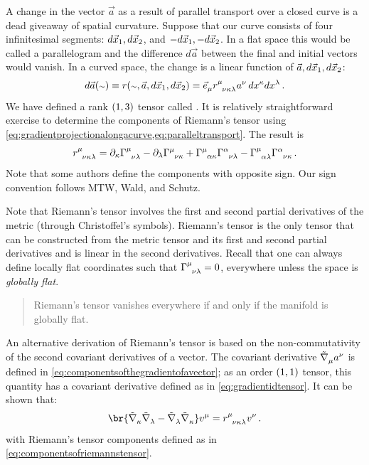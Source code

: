  A change in the vector $\vec a$ as a result of parallel transport over a closed curve is a dead giveaway of spatial curvature. Suppose that our curve consists of four infinitesimal segments: $d\vec{x}_1, d\vec{x}_2$, and $-d\vec{x}_1,-d\vec{x}_2$. In a flat space this would be called a parallelogram and the difference $d\vec a$ between the final and initial vectors would vanish. In a curved space, the change is a linear function of $\vec a,d\vec{x}_1,d\vec{x}_2$:
%
\begin{equation}\label{eq:definitionofriemannstensor}
  d\vec a\vat{\cslot} \defas \riemann\vat{\cslot,\vec a,d\vec\pos_1,d\vec\pos_2}
                      = \tbvec\mu\triemann\mu\nu\kappa\lambda\tvec a\nu\,d\tvec\pos\kappa d\tvec\pos\lambda\,.
\end{equation}
%
We have defined a rank $\torder 13$ tensor called . It is relatively straightforward exercise to determine the components of Riemann's tensor using \cref{eq:gradientprojectionalongacurve,eq:paralleltransport}. The result is
%
\begin{equation}\label{eq:componentsofriemannstensor}
  \triemann\mu\nu\kappa\lambda = \ipd\kappa\tchris\mu\nu\lambda 
                               - \ipd\lambda\tchris\mu\nu\kappa
                               + \tchris\mu\alpha\kappa \tchris\alpha\nu\lambda
                               - \tchris\mu\alpha\lambda \tchris\alpha\nu\kappa \,.
\end{equation}
%
Note that some authors define the components with opposite sign. Our sign convention follows MTW, Wald, and Schutz.

 Note that Riemann's tensor involves the first and second partial derivatives of the metric (through Christoffel's symbols). Riemann's tensor is the only tensor that can be constructed from the metric tensor and its first and second partial derivatives and is linear in the second derivatives. Recall that one can always define locally flat coordinates such that $\tchris\mu\nu\lambda = 0$, everywhere unless the space is \emph{globally flat}.
%
\begin{quotation}
  Riemann's tensor vanishes everywhere if and only if the manifold is globally flat.
\end{quotation}

 An alternative derivation of Riemann's tensor is based on the non-commutativity of the second covariant derivatives of a vector. The covariant derivative $\tgradcov\mu\tvec a\nu$ is defined in \cref{eq:componentsofthegradientofavector}; as an order $\torder 11$ tensor, this quantity has a covariant derivative defined as in \cref{eq:gradientidtensor}. It can be shown that:
%
\begin{equation}\label{eq:riemanntensorequality}
  \br{\tgradcov\kappa\tgradcov\lambda - \tgradcov\lambda\tgradcov\kappa}\tvec v\mu 
    = \triemann\mu\nu\kappa\lambda\tvec v\nu\,.
\end{equation}
%
with Riemann's tensor components defined as in \cref{eq:componentsofriemannstensor}.


